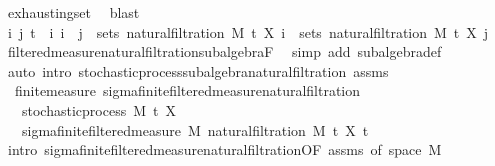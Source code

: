\begin{isabellebody}
\ exhausting{\isacharunderscore}{\kern0pt}set\ \isamarkupfalse%
\ blast\isanewline
\ \ \isamarkupfalse%
\ {\isachardoublequoteopen}{\isasymAnd}i\ j{\isachardot}{\kern0pt}\ {\isasymlbrakk}t\ {\isasymle}\ i{\isacharsemicolon}{\kern0pt}\ i\ {\isasymle}\ j{\isasymrbrakk}\ {\isasymLongrightarrow}\ sets\ {\isacharparenleft}{\kern0pt}natural{\isacharunderscore}{\kern0pt}filtration\ M\ t\ X\ i{\isacharparenright}{\kern0pt}\ {\isasymsubseteq}\ sets\ {\isacharparenleft}{\kern0pt}natural{\isacharunderscore}{\kern0pt}filtration\ M\ t\ X\ j{\isacharparenright}{\kern0pt}{\isachardoublequoteclose}\ \isamarkupfalse%
\ filtered{\isacharunderscore}{\kern0pt}measure{\isacharunderscore}{\kern0pt}natural{\isacharunderscore}{\kern0pt}filtration{\isachardot}{\kern0pt}subalgebra{\isacharunderscore}{\kern0pt}F\ \isamarkupfalse%
\ {\isacharparenleft}{\kern0pt}simp\ add{\isacharcolon}{\kern0pt}\ subalgebra{\isacharunderscore}{\kern0pt}def{\isacharparenright}{\kern0pt}\isanewline
{}\isamarkupfalse%
\ {\isacharparenleft}{\kern0pt}auto\ intro{\isacharcolon}{\kern0pt}\ stochastic{\isacharunderscore}{\kern0pt}process{\isachardot}{\kern0pt}subalgebra{\isacharunderscore}{\kern0pt}natural{\isacharunderscore}{\kern0pt}filtration\ assms{\isacharparenleft}{\kern0pt}{}{\isacharparenright}{\kern0pt}{\isacharparenright}{\kern0pt}%
\endisatagproof
{\isafoldproof}%
%
\isadelimproof
\isanewline
%
\endisadelimproof
\isanewline
{}\isamarkupfalse%
\ {\isacharparenleft}{\kern0pt}\ finite{\isacharunderscore}{\kern0pt}measure{\isacharparenright}{\kern0pt}\ sigma{\isacharunderscore}{\kern0pt}finite{\isacharunderscore}{\kern0pt}filtered{\isacharunderscore}{\kern0pt}measure{\isacharunderscore}{\kern0pt}natural{\isacharunderscore}{\kern0pt}filtration{\isacharcolon}{\kern0pt}\isanewline
\ \ \ {\isachardoublequoteopen}stochastic{\isacharunderscore}{\kern0pt}process\ M\ t\ X{\isachardoublequoteclose}\isanewline
\ \ \ {\isachardoublequoteopen}sigma{\isacharunderscore}{\kern0pt}finite{\isacharunderscore}{\kern0pt}filtered{\isacharunderscore}{\kern0pt}measure\ M\ {\isacharparenleft}{\kern0pt}natural{\isacharunderscore}{\kern0pt}filtration\ M\ t\ X{\isacharparenright}{\kern0pt}\ t\isanewline
%
\isadelimproof
%
\endisadelimproof
%
\isatagproof
{}\isamarkupfalse%
\ {\isacharparenleft}{\kern0pt}intro\ sigma{\isacharunderscore}{\kern0pt}finite{\isacharunderscore}{\kern0pt}filtered{\isacharunderscore}{\kern0pt}measure{\isacharunderscore}{\kern0pt}natural{\isacharunderscore}{\kern0pt}filtration{\isacharbrackleft}{\kern0pt}OF\ assms{\isacharparenleft}{\kern0pt}{}{\isacharparenright}{\kern0pt}{\isacharcomma}{\kern0pt}\ of\ {\isachardoublequoteopen}{\isacharbraceleft}{\kern0pt}space\ M{\isacharbraceright}{\kern0pt}{\isachardoublequoteclose}{\isacharbrackright}{\kern0pt}{\isacharparenright}{\kern0pt}\isanewline

\end{isabellebody}
